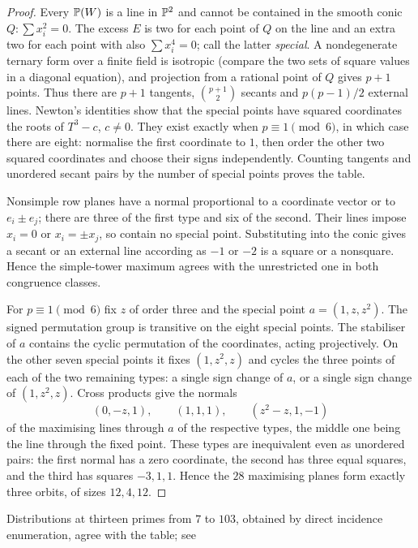\begin{proof}
Every $\mathbb{P}(W)$ is a line in $\mathbb{P}^2$ and cannot be contained in the
smooth conic $Q:\sum x_i^2=0$. The excess $E$ is two for each point of
$Q$ on the line and an extra two for each point with also $\sum x_i^4=0$;
call the latter \emph{special}. A nondegenerate ternary form over a
finite field is isotropic (compare the two sets of square values in a
diagonal equation), and projection from a rational point of $Q$ gives
$p+1$ points. Thus there are $p+1$ tangents, $\binom{p+1}2$ secants and
$p(p-1)/2$ external lines. Newton's identities show that the special
points have squared coordinates the roots of $T^3-c$, $c\ne0$. They exist
exactly when $p\equiv1\pmod6$, in which case there are eight: normalise
the first coordinate to $1$, then order the other two squared coordinates
and choose their signs independently. Counting tangents and unordered
secant pairs by the number of special points proves the table.

Nonsimple row planes have a normal proportional to a coordinate vector or
to $e_i\pm e_j$; there are three of the first type and six of the second.
Their lines impose $x_i=0$ or $x_i=\pm x_j$, so contain no special point.
Substituting into the conic gives a secant or an external line according
as $-1$ or $-2$ is a square or a nonsquare. Hence the simple-tower maximum
agrees with the unrestricted one in both congruence classes.

For $p\equiv1\pmod6$ fix $z$ of order three and the special point
$a=(1,z,z^2)$. The signed permutation group is transitive on the eight
special points. The stabiliser of $a$ contains the cyclic permutation of
the coordinates, acting projectively. On the other seven special points
it fixes $(1,z^2,z)$ and cycles the three points of each of the two
remaining types: a single sign change of $a$, or a single sign change of
$(1,z^2,z)$. Cross products give the normals
\[
 (0,-z,1),\qquad(1,1,1),\qquad(z^2-z,1,-1)
\]
of the maximising lines through $a$ of the respective types, the middle
one being the line through the fixed point. These types are inequivalent
even as unordered pairs: the first normal has a zero coordinate, the
second has three equal squares, and the third has squares $-3,1,1$. Hence
the $28$ maximising planes form exactly three orbits, of sizes $12,4,12$.
\end{proof}

Distributions at thirteen primes from $7$ to $103$, obtained by direct
incidence enumeration, agree with the table; see

